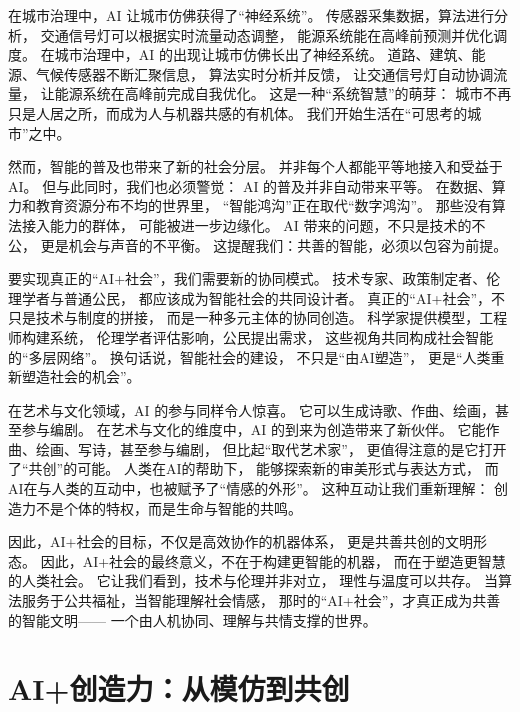 在城市治理中，AI 让城市仿佛获得了“神经系统”。  
传感器采集数据，算法进行分析，  
交通信号灯可以根据实时流量动态调整，  
能源系统能在高峰前预测并优化调度。  
在城市治理中，AI 的出现让城市仿佛长出了神经系统。  
道路、建筑、能源、气候传感器不断汇聚信息，  
算法实时分析并反馈，  
让交通信号灯自动协调流量，  
让能源系统在高峰前完成自我优化。  
这是一种“系统智慧”的萌芽：  
城市不再只是人居之所，而成为人与机器共感的有机体。  
我们开始生活在“可思考的城市”之中。

然而，智能的普及也带来了新的社会分层。  
并非每个人都能平等地接入和受益于AI。  
但与此同时，我们也必须警觉：  
AI 的普及并非自动带来平等。  
在数据、算力和教育资源分布不均的世界里，  
“智能鸿沟”正在取代“数字鸿沟”。  
那些没有算法接入能力的群体，  
可能被进一步边缘化。  
AI 带来的问题，不只是技术的不公，  
更是机会与声音的不平衡。  
这提醒我们：共善的智能，必须以包容为前提。

要实现真正的“AI+社会”，我们需要新的协同模式。  
技术专家、政策制定者、伦理学者与普通公民，  
都应该成为智能社会的共同设计者。  
真正的“AI+社会”，不只是技术与制度的拼接，  
而是一种多元主体的协同创造。  
科学家提供模型，工程师构建系统，  
伦理学者评估影响，公民提出需求，  
这些视角共同构成社会智能的“多层网络”。  
换句话说，智能社会的建设，  
不只是“由AI塑造”，  
更是“人类重新塑造社会的机会”。

在艺术与文化领域，AI 的参与同样令人惊喜。  
它可以生成诗歌、作曲、绘画，甚至参与编剧。  
在艺术与文化的维度中，AI 的到来为创造带来了新伙伴。  
它能作曲、绘画、写诗，甚至参与编剧，  
但比起“取代艺术家”，  
更值得注意的是它打开了“共创”的可能。  
人类在AI的帮助下，  
能够探索新的审美形式与表达方式，  
而AI在与人类的互动中，也被赋予了“情感的外形”。  
这种互动让我们重新理解：  
创造力不是个体的特权，而是生命与智能的共鸣。

因此，AI+社会的目标，不仅是高效协作的机器体系，  
更是共善共创的文明形态。  
因此，AI+社会的最终意义，不在于构建更智能的机器，  
而在于塑造更智慧的人类社会。  
它让我们看到，技术与伦理并非对立，  
理性与温度可以共存。  
当算法服务于公共福祉，当智能理解社会情感，  
那时的“AI+社会”，才真正成为共善的智能文明——  
一个由人机协同、理解与共情支撑的世界。

\section{AI+创造力：从模仿到共创}

